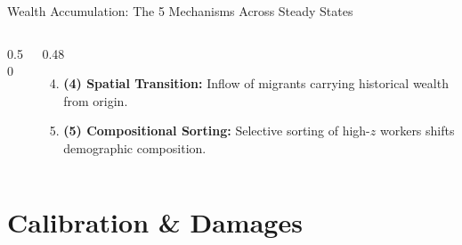 \documentclass[aspectratio=169, 10pt]{beamer}
\begin{document}
\begin{frame}{Wealth Accumulation: The 5 Mechanisms Across Steady States}
\begin{tcolorbox}[leafbox, title=Recap of the 5 Mechanisms]
\begin{columns}[T]
\begin{column}{0.50\textwidth}
\begin{enumerate}
                \end{enumerate}
            \end{column}
            \begin{column}{0.48\textwidth}
                \begin{enumerate}\setcounter{enumi}{3}\setlength{\itemsep}{0pt}
                    \item \textcolor{lightemerald}{\textbf{(4) Spatial Transition:}} Inflow of migrants carrying historical wealth from origin.
                    \item \textcolor{cobaltblue}{\textbf{(5) Compositional Sorting:}} Selective sorting of high-$z$ workers shifts demographic composition.
                \end{enumerate}
            \end{column}
        \end{columns}
    \end{tcolorbox}
\end{frame}

\section{Calibration \& Damages}
\end{document}
